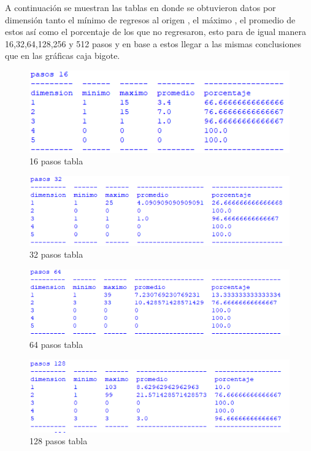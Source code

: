 \documentclass[a4paper]{article}
\begin{document}
A continuación se muestran las tablas en donde se obtuvieron datos por dimensión tanto el mínimo de regresos al origen , el máximo , el promedio de estos así como el porcentaje de los que no regresaron, esto para de igual manera 16,32,64,128,256 y 512 pasos y en base a estos llegar a las mismas conclusiones que en las gráficas caja bigote.
    \begin{figure}[H]
      \centering                      %
      \includegraphics[scale=1.1]{16_pasos_tabla.png} 
      \caption{16 pasos tabla} 
      \label{tab16}
    \end{figure}

    \begin{figure}[H]
      \centering                      %
      \includegraphics[scale=1]{32_pasos_tabla.png} 
      \caption{32 pasos tabla} 
      \label{tab32}
    \end{figure}

    \begin{figure}[H]
      \centering                      %
      \includegraphics[scale=1]{64_pasos_tabla.png}  
      \caption{64 pasos tabla} 
      \label{tab64}
    \end{figure}

    \begin{figure}[H]
      \centering                      %
      \includegraphics[scale=1]{128_pasos_tablas.png} 
      \caption{128 pasos tabla} 
      \label{tab128}
    \end{figure}
\end{document}
